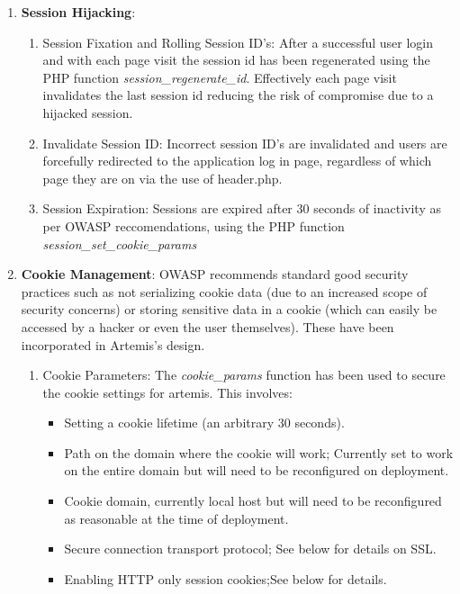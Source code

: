 \begin{enumerate}
    \begin{enumerate}
        \item \textbf{Session Hijacking}: 
        \begin{enumerate}
            \item Session Fixation\cite{OWASPa} and Rolling Session ID's: After a successful user login and with each page visit the session id has been regenerated using the PHP function \textit{session\_regenerate\_id}. Effectively each page visit invalidates the last session id reducing the risk of compromise due to a hijacked session.
            \item Invalidate Session ID: Incorrect session ID's are invalidated and users are forcefully redirected to the application log in page, regardless of which page they are on via the use of header.php.
            \item Session Expiration: Sessions are expired after 30 seconds of inactivity as per OWASP reccomendations, using the PHP function \textit{session\_set\_cookie\_params}
        \end{enumerate}
        \item \textbf{Cookie Management}:
        OWASP \cite{OWASPa} recommends standard good security practices such as not serializing cookie data (due to an increased scope of security concerns) or storing sensitive data in a cookie (which can easily be accessed by a hacker or even the user themselves).  These have been incorporated in Artemis's design.
        \begin{enumerate}
            \item Cookie Parameters: The \textit{cookie\_params} function has been used to secure the cookie settings for artemis. This involves:
                \begin{itemize}
                    \item Setting a cookie lifetime (an arbitrary 30 seconds).
                    \item Path on the domain where the cookie will work; Currently set to work on the entire domain but will need to be reconfigured on deployment.
                    \item Cookie domain, currently local host but will need to be reconfigured as reasonable at the time of deployment.
                    \item Secure connection transport protocol; See below for details on SSL.
                    \item Enabling HTTP only session cookies;See below for details.

\end{itemize}
\end{enumerate}
\end{enumerate}
\end{enumerate}
